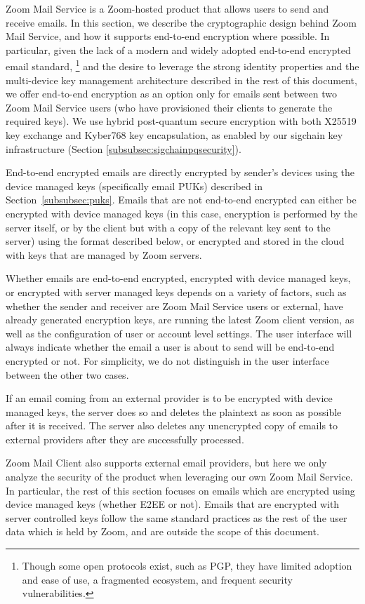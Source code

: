 \label{sec:zoommailservice}
Zoom Mail Service is a Zoom-hosted product that allows users to send and receive emails. In this
section, we describe the cryptographic design behind Zoom Mail Service, and how it supports
end-to-end encryption where possible. In particular, given the lack of a modern and widely adopted
end-to-end encrypted email standard,%
%
\footnote{Though some open protocols exist, such as PGP, they have limited adoption and ease of use,
a fragmented ecosystem, and frequent security vulnerabilities.}
%
and the desire to leverage the strong identity properties and the multi-device key management
architecture described in the rest of this document, we offer end-to-end encryption as an option
only for emails sent between two Zoom Mail Service users (who have provisioned their clients to
generate the required keys). We use hybrid post-quantum secure encryption with both X25519 key
exchange and Kyber768 key encapsulation, as enabled by our sigchain key infrastructure (Section
\ref{subsubsec:sigchainpqsecurity}).

End-to-end encrypted emails are directly encrypted by sender's devices using the device managed keys
(specifically email PUKs) described in Section~\ref{subsubsec:puks}. Emails that are not end-to-end
encrypted can either be encrypted with device managed keys (in this case, encryption is performed by
the server itself, or by the client but with a copy of the relevant key sent to the server) using
the format described below, or encrypted and stored in the cloud with keys that are managed by Zoom
servers.

Whether emails are end-to-end encrypted, encrypted with device managed keys, or encrypted with
server managed keys depends on a variety of factors, such as whether the sender and receiver are
Zoom Mail Service users or external, have already generated encryption keys, are running the latest
Zoom client version, as well as the configuration of user or account level settings. The user
interface will always indicate whether the email a user is about to send will be end-to-end
encrypted or not. For simplicity, we do not distinguish in the user interface between the other two
cases.

If an email coming from an external provider is to be encrypted with device managed keys, the server
does so and deletes the plaintext as soon as possible after it is received. The server also deletes
any unencrypted copy of emails to external providers after they are successfully processed.

Zoom Mail Client also supports external email providers, but here we only analyze the security of
the product when leveraging our own Zoom Mail Service. In particular, the rest of this section
focuses on emails which are encrypted using device managed keys (whether E2EE or not). Emails that
are encrypted with server controlled keys follow the same standard practices as the rest of the user
data which is held by Zoom, and are outside the scope of this document.

